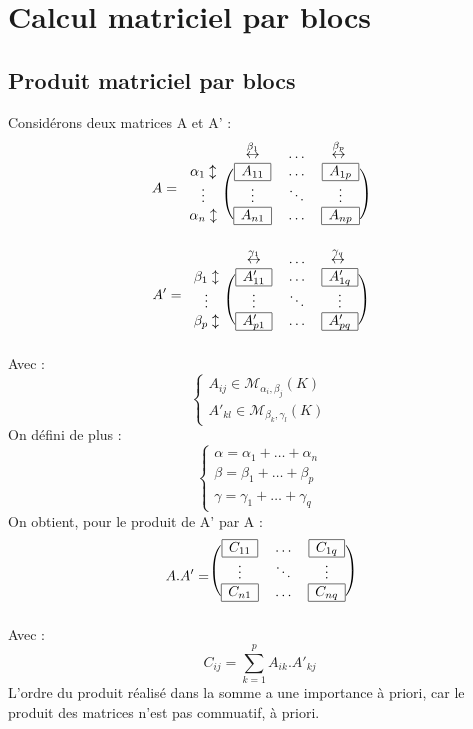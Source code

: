 \chapter{Calcul matriciel par blocs}
\section{Produit matriciel par blocs}
Considérons deux matrices A et A' : 
\[A = \begin{blockarray}{cccc}
        & \overset{\beta_1}\leftrightarrow & \dots & \overset{\beta_p}\leftrightarrow  \\
        \begin{block}{c(ccc)}
        \alpha_1 \updownarrow & \mesbloc{A_{11}}  & \dots & \mesbloc{A_{1p}}  \\
        \vdots  & \vdots & \ddots & \vdots      \\
        \alpha_n \updownarrow   & \mesbloc{A_{n1}} & \dots  & \mesbloc{A_{np}}   \\
        \end{block}
        \end{blockarray}
\] 
\[A' = \begin{blockarray}{cccc}
        & \overset{\gamma_1}\leftrightarrow & \dots & \overset{\gamma_q}\leftrightarrow  \\
        \begin{block}{c(ccc)}
        \beta_1 \updownarrow & \mesbloc{A'_{11}}  & \dots & \mesbloc{A'_{1q}}  \\
        \vdots  & \vdots & \ddots & \vdots      \\
        \beta_p \updownarrow   & \mesbloc{A'_{p1}} & \dots  & \mesbloc{A'_{pq}}   \\
        \end{block}
        \end{blockarray}
\] 
Avec :
$$\begin{cases}
A_{ij} \in  \mathcal{M}_{\alpha_i,\beta_j}(K) \\  A'_{kl} \in  \mathcal{M}_{\beta_k,\gamma_l}(K)
\end{cases}$$
On défini de plus : 
$$\begin{cases}
\alpha = \alpha_1 + \dots + \alpha_n \\ \beta = \beta_1 + \dots + \beta_p \\ \gamma = \gamma_1 + \dots + \gamma_q
\end{cases}$$
On obtient, pour le produit de A' par A :
\[A.A' = \begin{blockarray}{ccc}
        \begin{block}{(ccc)}
         \mesbloc{C_{11}}  & \dots & \mesbloc{C_{1q}}  \\
         \vdots & \ddots & \vdots      \\
         \mesbloc{C_{n1}} & \dots  & \mesbloc{C_{nq}}   \\
        \end{block}
        \end{blockarray}
\] 
Avec : 
$$C_{ij} = \sum_{k=1}^p A_{ik}.A'_{kj}$$
L'ordre du produit réalisé dans la somme a une importance à priori, car le produit des matrices n'est pas commuatif, à priori.
